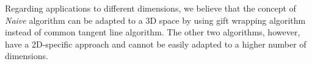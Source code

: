 \documentclass[letterpaper]{article}
\theoremstyle{definition}
\begin{document}
Regarding applications to different dimensions, we believe that the concept of \textit{Naive} algorithm can be adapted to a 3D space by using gift wrapping algorithm instead of common tangent line algorithm.
The other two algorithms, however, have a 2D-specific approach and cannot be easily adapted to a higher number of dimensions.



\end{document}
